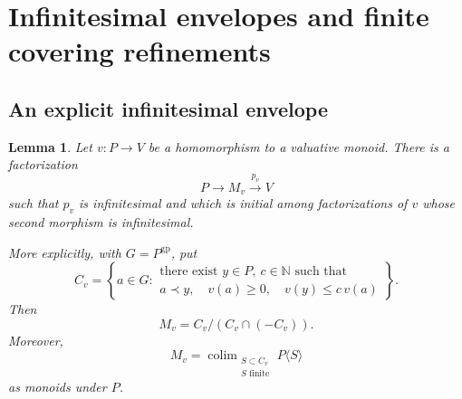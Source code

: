 \documentclass[11pt]{article}
\newtheorem{lemma}[theorem]{Lemma}
\theoremstyle{definition}
\theoremstyle{remark}
\DeclareMathOperator{\colim}{colim}
\newcommand{\gp}{\mathrm{gp}}
\newcommand{\NN}{\mathbb N}
\begin{document}
\section{Infinitesimal envelopes and finite covering refinements}

\subsection{An explicit infinitesimal envelope}

\begin{lemma}\label{lem:envelope}
Let \(v:P\to V\) be a homomorphism to a valuative monoid. There is a
factorization
\[
P\longrightarrow M_v\xrightarrow{p_v}V
\]
such that \(p_v\) is infinitesimal and which is initial among
factorizations of \(v\) whose second morphism is infinitesimal.

More explicitly, with \(G=P^{\gp}\), put
\begin{equation}\label{eq:envelope-cone}
C_v=
\left\{
a\in G:
\begin{array}{l}
\text{there exist }y\in P,\ c\in\NN\text{ such that}\\
a\prec y,\quad v(a)\ge0,\quad v(y)\le c\,v(a)
\end{array}
\right\}.
\end{equation}
Then
\[
M_v=C_v/(C_v\cap(-C_v)).
\]
Moreover,
\begin{equation}\label{eq:envelope-colimit}
M_v=\colim_{\substack{S\subset C_v\\S\text{ finite}}}
P\langle S\rangle
\end{equation}
as monoids under \(P\).
\end{lemma}

\end{document}
